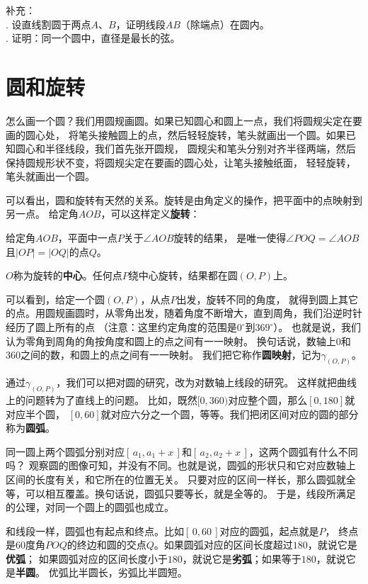 \documentclass[12pt,UTF8]{ctexbook}
\begin{document}
\begin{xt}\label{xt:0-0-0}
    补充：\\
    . 设直线割圆于两点$A$、$B$，证明线段$AB$（除端点）在圆内。\\
    . 证明：同一个圆中，直径是最长的弦。
\end{xt}

\section{圆和旋转}
怎么画一个圆？我们用圆规画圆。如果已知圆心和圆上一点，我们将圆规尖定在要画的圆心处，
将笔头接触圆上的点，然后轻轻旋转，笔头就画出一个圆。如果已知圆心和半径线段，我们首先张开圆规，
圆规尖和笔头分别对齐半径两端，然后保持圆规形状不变，将圆规尖定在要画的圆心处，让笔头接触纸面，
轻轻旋转，笔头就画出一个圆。

可以看出，圆和旋转有天然的关系。旋转是由角定义的操作，把平面中的点映射到另一点。
给定角$AOB$，可以这样定义\textbf{旋转}：

\begin{df}\label{df:0-1-0}
    给定角$AOB$，平面中一点$P$关于$\angle AOB$旋转的结果，
    是唯一使得$\angle POQ = \angle AOB$且$|OP| = |OQ|$的点$Q$。
\end{df}
$O$称为旋转的\textbf{中心}。任何点$P$绕中心旋转，结果都在圆$(O,P)$上。

可以看到，给定一个圆$(O,P)$，从点$P$出发，旋转不同的角度，
就得到圆上其它的点。用圆规画圆时，从零角出发，随着角度不断增大，直到周角，我们沿逆时针经历了圆上所有的点
（注意：这里约定角度的范围是$0^\circ$到$369^\circ$）。
也就是说，我们认为零角到周角的角按角度和圆上的点之间有一一映射。
换句话说，数轴上$0$和$360$之间的数，和圆上的点之间有一一映射。
我们把它称作\textbf{圆映射}，记为$\gamma_{(O,P)}$。

通过$\gamma_{(O,P)}$，我们可以把对圆的研究，改为对数轴上线段的研究。
这样就把曲线上的问题转为了直线上的问题。
比如，既然$[0, 360)$对应整个圆，那么$[0,180]$就对应半个圆，
$[0,60]$就对应六分之一个圆，等等。我们把闭区间对应的圆的部分称为\textbf{圆弧}。

同一圆上两个圆弧分别对应$[\, a_1, a_1+x\, ]$和$[\, a_2, a_2+x \,]$，这两个圆弧有什么不同吗？
观察圆的图像可知，并没有不同。也就是说，圆弧的形状只和它对应数轴上区间的长度有关，和它所在的位置无关。
只要对应的区间一样长，那么圆弧就全等，可以相互覆盖。换句话说，圆弧只要等长，就是全等的。
于是，线段所满足的公理，对同一个圆上的圆弧也成立。

和线段一样，圆弧也有起点和终点。比如$[\, 0,60\, ]$对应的圆弧，起点就是$P$，
终点是$60$度角$POQ$的终边和圆的交点$Q$。如果圆弧对应的区间长度超过$180$，就说它是\textbf{优弧}；
如果圆弧对应的区间长度小于$180$，就说它是\textbf{劣弧}；如果等于$180$，就说它是\textbf{半圆}。
优弧比半圆长，劣弧比半圆短。
\end{document}

